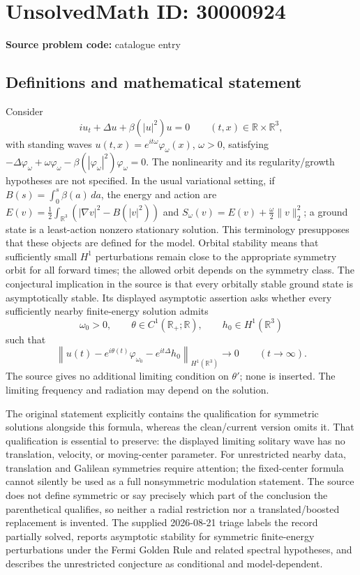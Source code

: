 \documentclass[11pt]{article}
\newcommand{\R}{\mathbb{R}}
\begin{document}
\section*{UnsolvedMath ID: 30000924}
\textbf{Source problem code:} catalogue entry
\subsection{Definitions and mathematical statement}
Consider \[iu_t+\Delta u+\beta(|u|^2)u=0\qquad (t,x)\in\R\times\R^3,\] with standing waves $u(t,x)=e^{it\omega}\varphi_\omega(x)$, $\omega>0$, satisfying $-\Delta\varphi_\omega+\omega\varphi_\omega-\beta(|\varphi_\omega|^2)\varphi_\omega=0$. The nonlinearity and its regularity/growth hypotheses are not specified. In the usual variational setting, if $B(s)=\int_0^s\beta(a)\,da$, the energy and action are $E(v)=\tfrac12\int_{\R^3}(|\nabla v|^2-B(|v|^2))$ and $S_\omega(v)=E(v)+\tfrac\omega2\|v\|_2^2$; a ground state is a least-action nonzero stationary solution. This terminology presupposes that these objects are defined for the model. Orbital stability means that sufficiently small $H^1$ perturbations remain close to the appropriate symmetry orbit for all forward times; the allowed orbit depends on the symmetry class. The conjectural implication in the source is that every orbitally stable ground state is asymptotically stable. Its displayed asymptotic assertion asks whether every sufficiently nearby finite-energy solution admits \[\omega_0>0,\qquad\theta\in C^1(\R_+;\R),\qquad h_0\in H^1(\R^3)\] such that \[\left\|u(t)-e^{i\theta(t)}\varphi_{\omega_0}-e^{it\Delta}h_0\right\|_{H^1(\R^3)}\longrightarrow0\qquad(t\to\infty).\] The source gives no additional limiting condition on $\theta'$; none is inserted. The limiting frequency and radiation may depend on the solution.\par The original statement explicitly contains the qualification for symmetric solutions alongside this formula, whereas the clean/current version omits it. That qualification is essential to preserve: the displayed limiting solitary wave has no translation, velocity, or moving-center parameter. For unrestricted nearby data, translation and Galilean symmetries require attention; the fixed-center formula cannot silently be used as a full nonsymmetric modulation statement. The source does not define symmetric or say precisely which part of the conclusion the parenthetical qualifies, so neither a radial restriction nor a translated/boosted replacement is invented. The supplied 2026-08-21 triage labels the record partially solved, reports asymptotic stability for symmetric finite-energy perturbations under the Fermi Golden Rule and related spectral hypotheses, and describes the unrestricted conjecture as conditional and model-dependent.
\end{document}
